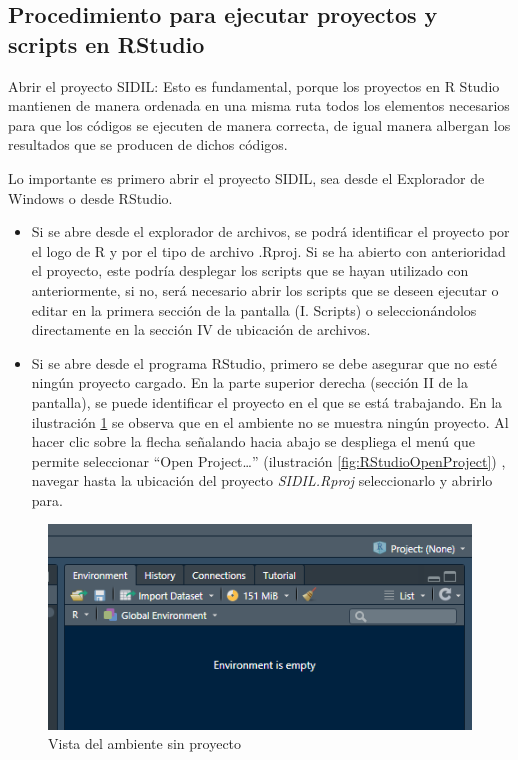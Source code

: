 \documentclass[
]{article}
\begin{document}
\hypertarget{procedimiento-para-ejecutar-proyectos-y-scripts-en-rstudio}{%
\subsection{Procedimiento para ejecutar proyectos y scripts en RStudio}\label{procedimiento-para-ejecutar-proyectos-y-scripts-en-rstudio}}

Abrir el proyecto SIDIL: Esto es fundamental, porque los proyectos en R Studio mantienen de manera ordenada en una misma ruta todos los elementos necesarios para que los códigos se ejecuten de manera correcta, de igual manera albergan los resultados que se producen de dichos códigos.

Lo importante es primero abrir el proyecto SIDIL, sea desde el Explorador de Windows o desde RStudio.

\begin{itemize}
\item
  Si se abre desde el explorador de archivos, se podrá identificar el proyecto por el logo de R y por el tipo de archivo .Rproj. Si se ha abierto con anterioridad el proyecto, este podría desplegar los scripts que se hayan utilizado con anteriormente, si no, será necesario abrir los scripts que se deseen ejecutar o editar en la primera sección de la pantalla (I. Scripts) o seleccionándolos directamente en la sección IV de ubicación de archivos.
\item
  Si se abre desde el programa RStudio, primero se debe asegurar que no esté ningún proyecto cargado. En la parte superior derecha (sección II de la pantalla), se puede identificar el proyecto en el que se está trabajando. En la ilustración \ref{fig:RStudioProyectoVacio} se observa que en el ambiente no se muestra ningún proyecto. Al hacer clic sobre la flecha señalando hacia abajo se despliega el menú que permite seleccionar ``Open Project\ldots{}'' (ilustración \ref{fig:RStudioOpenProject}) , navegar hasta la ubicación del proyecto \emph{SIDIL.Rproj} seleccionarlo y abrirlo para.
\end{itemize}

\begin{figure}
\includegraphics[width=6.65in]{images-1/06/proyectoVacio} \caption{Vista del ambiente sin proyecto}\label{fig:RStudioProyectoVacio}
\end{figure}
\end{document}
